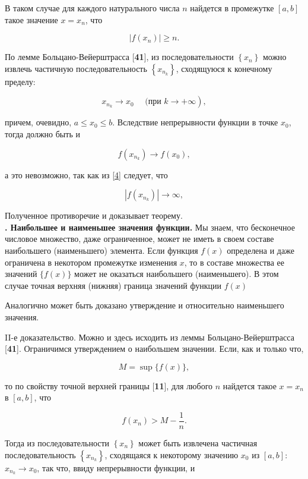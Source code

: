 \documentclass[10pt, twoside]{article}
\newcounter{subtopic}
\newcommand{\subtopic}[1]{%
  \stepcounter{subtopic}%
  \gdef\thesubtopic{\arabic{subtopic}}
  \textbf{\arabic{subtopic}. #1}
}
\begin{document}
В таком случае для каждого натурального числа $n$ найдется в промежутке $[a, b]$ такое значение $x=x_{n}$, что


\begin{equation*}
  \left|f\left(x_{n}\right)\right| \geqslant  n. \tag{4}\label{4}
\end{equation*}


По лемме Больцано-Вейерштрасса [\textbf{41}], из последовательности $\left\{x_{n}\right\}$ можно извлечь частичную последовательность $\left\{x_{n_{k}}\right\}$, сходящуюся к конечному пределу:

$$
  \left.x_{n_{k}} \to x_{0} \quad \text { (при } k \to+\infty\right),
$$

причем, очевидно, $a \leqslant x_{0} \leqslant b$. Вследствие непрерывности функции в точке $x_{0}$, тогда должно быть и

$$
  f\left(x_{n_{k}}\right) \to f\left(x_{0}\right),
$$

а это невозможно, так как из \eqref{4} следует, что

$$
  \left|f\left(x_{n_{k}}\right)\right| \to \infty,
$$

Полученное противоречие и доказывает теорему.\\
\subtopic{Наибольшее и наименьшее значения функции.} Мы знаем, что бесконечное числовое множество, даже ограниченное, может не иметь в своем составе наибольшего (наименьшего) элемента. Если функция $f(x)$ определена и даже ограничена в некотором промежутке изменения $x$, то в составе множества ее значений $\{f(x)\}$ может не оказаться наибольшего (наименьшего). В этом случае точная верхняя (нижняя) граница значений функции $f(x)$

\newpage
\setcounter{page}{177}
\setcounter{subtopic}{85}
Аналогично может быть доказано утверждение и относительно наименьшего значения.

II-е доказательство. Можно и здесь исходить из леммы Больцано-Вейерштрасса [\textbf{41}]. Ограничимся утверждением о наибольшем значении. Если, как и только что,

$$
  M=\sup \{f(x)\},
$$

то по свойству точной верхней границы [\textbf{11}], для любого $n$ найдется такое $x=x_{n}$ в $[a, b]$, что


\begin{equation*}
  f\left(x_{n}\right)>M-\frac{1}{n}. \tag{5}\label{5}
\end{equation*}


Тогда из последовательности $\left\{x_{n}\right\}$ может быть извлечена частичная последовательность $\left\{x_{n_{k}}\right\}$, сходящаяся к некоторому значению $x_{0}$ из $[a, b]$: $x_{n_{k}} \to x_{0}$, так что, ввиду непрерывности функции, и
\end{document}
